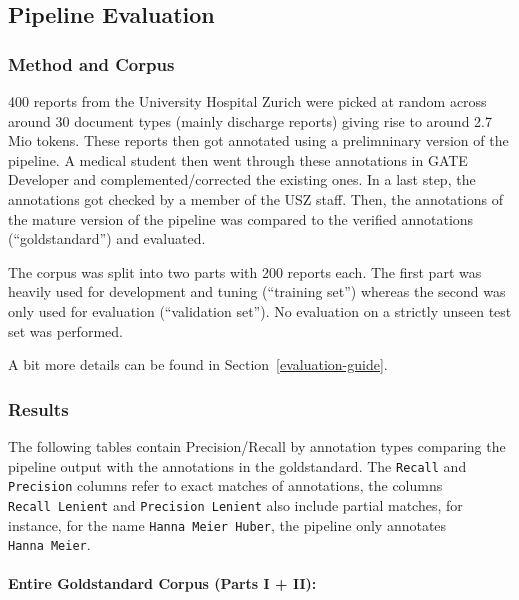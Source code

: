 \subsection{Pipeline Evaluation}\label{pipeline-evaluation}

\subsubsection{Method and Corpus}\label{method-and-corpus}

400 reports from the University Hospital Zurich were picked at random
across around 30 document types (mainly discharge reports) giving rise
to around 2.7 Mio tokens. These reports then got annotated using a
prelimninary version of the pipeline. A medical student then went
through these annotations in GATE Developer and complemented/corrected
the existing ones. In a last step, the annotations got checked by a
member of the USZ staff. Then, the annotations of the mature version of
the pipeline was compared to the verified annotations (``goldstandard'')
and evaluated.

The corpus was split into two parts with 200 reports each. The first
part was heavily used for development and tuning (``training set'')
whereas the second was only used for evaluation (``validation set''). No
evaluation on a strictly unseen test set was performed.

A bit more details can be found in Section~\ref{evaluation-guide}.

\subsubsection{Results}\label{results}

The following tables contain Precision/Recall by annotation types
comparing the pipeline output with the annotations in the goldstandard.
The \texttt{Recall} and \texttt{Precision} columns refer to exact
matches of annotations, the columns \texttt{Recall\ Lenient} and
\texttt{Precision\ Lenient} also include partial matches, for instance,
for the name \texttt{Hanna\ Meier\ Huber}, the pipeline only annotates
\texttt{Hanna\ Meier}.

\paragraph{Entire Goldstandard Corpus (Parts I +
II):}\label{entire-goldstandard-corpus-parts-i-ii}

